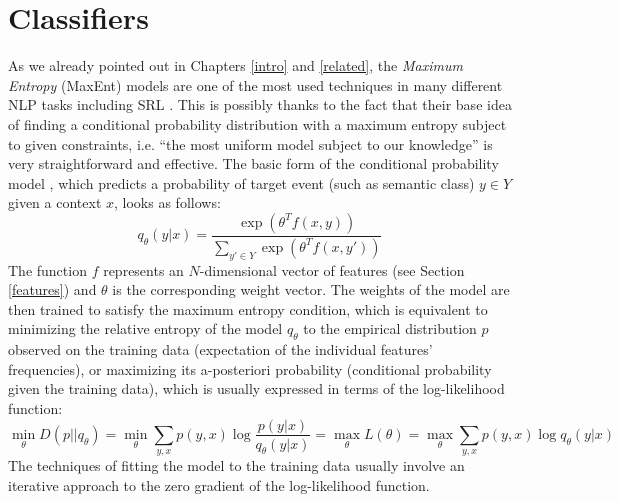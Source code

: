 \documentclass[12pt,notitlepage]{report}
\begin{document}

\section{Classifiers}\label{classifiers}

As we already pointed out in Chapters \ref{intro} and \ref{related}, the \emph{Maximum Entropy} (MaxEnt) models \citep[p. 219ff.]{jelinek97} are one of the most used techniques in many different NLP tasks \citep[p. 607f.]{manning00} including SRL \citep{jiang06,zhao09,che09,chen09}. This is possibly thanks to the fact that their base idea of finding a conditional probability distribution with a maximum entropy \citep[average uncertainty][p. 61]{manning00} subject to given constraints, i.e. ``the most uniform model subject to our knowledge'' \citep[p. 41]{berger96} is very straightforward and effective. The basic form of the conditional probability model \citep{malouf02}, which predicts a probability of target event (such as semantic class) $y\in Y$ given a context $x$, looks as follows: 
\begin{equation}
q_\theta(y|x) = \frac{\exp(\theta^T f(x,y))}{\sum_{y'\in Y} \exp(\theta^T f(x,y'))}
\end{equation}
The function $f$ represents an $N$-dimensional vector of features (see Section \ref{features}) and $\theta$ is the corresponding weight vector. The weights of the model are then trained to satisfy the maximum entropy condition, which is equivalent to minimizing the relative entropy \citep[or Kullback-Leibler Divergence][p. 72]{manning00} of the model $q_\theta$ to the empirical distribution $p$ observed on the training data (expectation of the individual features' frequencies), or maximizing its a-posteriori probability (conditional probability given the training data), which is usually expressed in terms of the log-likelihood function:
\begin{equation}\label{eq:maxent}
\min_\theta D(p||q_\theta) = \min_\theta \sum_{y,x} p(y,x) \log\frac{p(y|x)}{q_\theta(y|x)} = \max_\theta L(\theta) = \max_\theta \sum_{y,x} p(y,x) \log q_\theta(y|x)
\end{equation}
The techniques of fitting the model to the training data usually involve an iterative approach to the zero gradient of the log-likelihood function.
\end{document}
